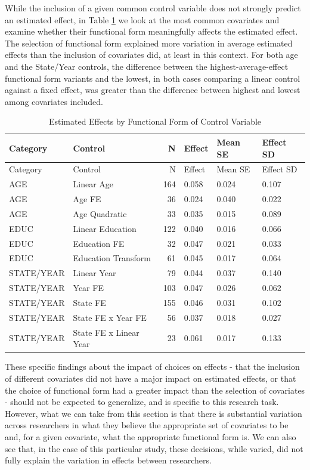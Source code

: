 \documentclass[
  letterpaper,
  DIV=11,
  numbers=noendperiod]{scrartcl}
\begin{document}
While the inclusion of a given common control variable does not strongly
predict an estimated effect, in Table
\ref{tab-effects-by-functional-form} we look at the most common
covariates and examine whether their functional form meaningfully
affects the estimated effect. The selection of functional form explained
more variation in average estimated effects than the inclusion of
covariates did, at least in this context. For both age and the
State/Year controls, the difference between the highest-average-effect
functional form variants and the lowest, in both cases comparing a
linear control against a fixed effect, was greater than the difference
between highest and lowest among covariates included.

\begin{longtable}[]{@{}llrlll@{}}
\caption{Estimated Effects by Functional Form of Control Variable
\label{tab-effects-by-functional-form}}\tabularnewline
\toprule\noalign{}
Category & Control & N & Effect & Mean SE & Effect SD \\
\midrule\noalign{}
\endfirsthead
\toprule\noalign{}
Category & Control & N & Effect & Mean SE & Effect SD \\
\midrule\noalign{}
\endhead
\bottomrule\noalign{}
\endlastfoot
AGE & Linear Age & 164 & 0.058 & 0.024 & 0.107 \\
AGE & Age FE & 36 & 0.024 & 0.040 & 0.022 \\
AGE & Age Quadratic & 33 & 0.035 & 0.015 & 0.089 \\
EDUC & Linear Education & 122 & 0.040 & 0.016 & 0.066 \\
EDUC & Education FE & 32 & 0.047 & 0.021 & 0.033 \\
EDUC & Education Transform & 61 & 0.045 & 0.017 & 0.064 \\
STATE/YEAR & Linear Year & 79 & 0.044 & 0.037 & 0.140 \\
STATE/YEAR & Year FE & 103 & 0.047 & 0.026 & 0.062 \\
STATE/YEAR & State FE & 155 & 0.046 & 0.031 & 0.102 \\
STATE/YEAR & State FE x Year FE & 56 & 0.037 & 0.018 & 0.027 \\
STATE/YEAR & State FE x Linear Year & 23 & 0.061 & 0.017 & 0.133 \\
\end{longtable}

These specific findings about the impact of choices on effects - that
the inclusion of different covariates did not have a major impact on
estimated effects, or that the choice of functional form had a greater
impact than the selection of covariates - should not be expected to
generalize, and is specific to this research task. However, what we can
take from this section is that there is substantial variation across
researchers in what they believe the appropriate set of covariates to be
and, for a given covariate, what the appropriate functional form is. We
can also see that, in the case of this particular study, these
decisions, while varied, did not fully explain the variation in effects
between researchers.
\end{document}
